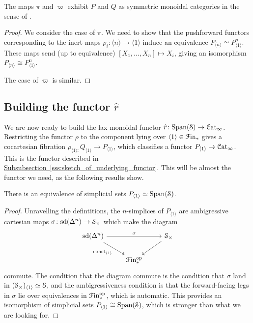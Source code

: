 \documentclass[main.tex]{subfiles}
\begin{document}
\begin{proposition}
  The maps $\pi$ and $\varpi$ exhibit $P$ and $Q$ as symmetric monoidal categories in the sense of \cite[Def.~2.0.0.7]{luriehigheralgebra}.
\end{proposition}
\begin{proof}
  We consider the case of $\pi$. We need to show that the pushforward functors corresponding to the inert maps $\rho_{i}\colon \langle n \rangle \to \langle 1 \rangle$ induce an equivalence $P_{\langle n \rangle} \simeq P_{\langle 1 \rangle}^{n}$. These maps send (up to equivalence) $[X_{1}, \ldots, X_{n}] \mapsto X_{i}$, giving an isomorphism $P_{\langle n \rangle} \cong P_{\langle 1 \rangle}^{n}$.

  The case of $\varpi$ is similar.
\end{proof}

\subsection{Building the functor \texorpdfstring{$\hat{r}$}{r}}
\label{ssc:building_the_functor}

We are now ready to build the lax monoidal functor $\hat{r}\colon \Span(\S) \to \ICat$. Restricting the functor $\rho$ to the component lying over $\langle 1 \rangle \in \Finp$ gives a cocartesian fibration $\rho_{\langle 1 \rangle\colon }Q_{\langle 1 \rangle} \to P_{\langle 1 \rangle}$, which classifies a functor $P_{\langle 1 \rangle} \to \ICat$. This is the functor described in \hyperref[sss:sketch_of_underlying_functor]{Subsubsection~\ref*{sss:sketch_of_underlying_functor}}. This will be almost the functor we need, as the following results show.

\begin{proposition}
  There is an equivalence of simplicial sets $P_{\langle 1 \rangle} \simeq \Span(\S)$.
\end{proposition}
\begin{proof}
  Unravelling the defintitions, the $n$-simplices of $P_{\langle 1 \rangle}$ are ambigressive cartesian maps $\sigma\colon \sd(\Delta^{n}) \to \S_{\times}$ which make the diagram
  \begin{equation*}
    \begin{tikzcd}
      \sd(\Delta^{n})
      \arrow[rr, "\sigma"]
      \arrow[dr, swap, "\const_{\langle 1 \rangle}"]
      && \S_{\times}
      \arrow[dl]
      \\
      & \Finp\op
    \end{tikzcd}
  \end{equation*}
  commute. The condition that the diagram commute is the condition that $\sigma$ land in $(\S_{\times})_{\langle 1 \rangle} \simeq \S$, and the ambigressiveness condition is that the forward-facing legs in $\sigma$ lie over equivalences in $\Finp\op$, which is automatic. This provides an isomorphism of simplicial sets $P_{\langle 1 \rangle} \cong \Span(\S)$, which is stronger than what we are looking for.
\end{proof}
\end{document}
